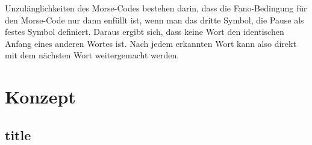 \documentclass[a4paper,12pt]{article}
\begin{document}
	Unzulänglichkeiten des Morse-Codes bestehen darin, dass die Fano-Bedingung für den Morse-Code nur dann enfüllt ist, wenn man das dritte Symbol, die Pause als festes Symbol definiert. Daraus ergibt sich, dass keine Wort den identischen Anfang eines anderen Wortes ist. Nach jedem erkannten Wort kann also direkt mit dem nächsten Wort weitergemacht werden.
	
	
	
	\newpage 
	\section{Konzept}
	\subsection{title}
\end{document}
